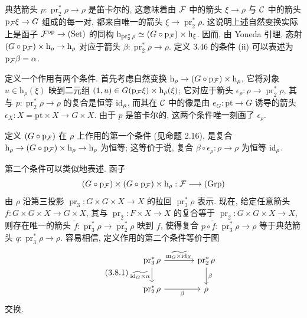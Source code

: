 典范箭头 $p:\operatorname{pr}_2^*\rho\to\rho$ 是笛卡尔的, 这意味着由 $\mathcal F$ 中的箭头 $\xi\to\rho$ 与 $\mathcal C$ 中的箭头 $\mathrm p_{\mathcal F}\xi\to G$ 组成的每一对, 都来自唯一的箭头 $\xi\to\operatorname{pr}_2^*\rho$. 这说明上述自然变换实际上是函子 $\mathcal F^{\mathrm{op}}\to(\mathrm{Set})$ 的同构 $\mathrm h_{\operatorname{pr}_2^*\rho}\simeq(G\circ\mathrm p_{\mathcal F})\times\mathrm h_\xi$. 因而, 由 Yoneda 引理, 态射 $(G\circ\mathrm p_{\mathcal F})\times\mathrm h_\rho\to\mathrm h_\rho$ 对应于箭头
$\beta:\operatorname{pr}_2^*\rho\to\rho$. 定义 3.46 的条件 (ii) 可以表述为 $\mathrm p_{\mathcal F}\beta=\alpha$.

定义一个作用有两个条件. 首先考虑自然变换 $\mathrm h_\rho\to(G\circ\mathrm p_{\mathcal F})\times\mathrm h_\rho$, 它将对象 $u\in\mathrm h_\rho(\xi)$ 映到二元组 $(1,u)\in G(\mathrm p_{\mathcal F}\xi)\times\mathrm h_\rho(\xi)$; 它对应于箭头 $\epsilon_\rho:\rho\to\operatorname{pr}_2^*\rho$, 其与 $p:\operatorname{pr}_2^*\rho\to\rho$ 的复合是恒等 $\mathrm{id}_\rho$, 而其在 $\mathcal C$ 中的像是由 $e_G:\mathrm{pt}\to G$ 诱导的箭头 $\epsilon_X:X=\mathrm{pt}\times X\to G\times X$. 由于 $p$ 是笛卡尔的, 这两个条件唯一刻画了 $\epsilon_\rho$.

定义 $(G\circ\mathrm p_{\mathcal F})$ 在 $\rho$ 上作用的第一个条件 (见命题 2.16), 是复合 $\mathrm h_\rho\to(G\circ\mathrm p_{\mathcal F})\times\mathrm h_\rho\to\mathrm h_\rho$ 为恒等; 这等价于说, 复合 $\beta\circ\epsilon_\rho:\rho\to\rho$ 为恒等 $\mathrm{id}_\rho$.

第二个条件可以类似地表述. 函子
\[
(G\circ\mathrm p_{\mathcal F})\times(G\circ\mathrm p_{\mathcal F})\times\mathrm h_\rho:\mathcal F\longrightarrow(\mathrm{Grp})
\]
由 $\rho$ 沿第三投影 $\operatorname{pr}_3:G\times G\times X\to X$ 的拉回 $\operatorname{pr}_3^*\rho$ 表示. 现在, 给定任意箭头 $f:G\times G\times X\to G\times X$, 其与 $\operatorname{pr}_2:F\times X\to X$ 的复合等于 $\operatorname{pr}_2:G\times G\times X\to X$, 则存在唯一的箭头 $\widetilde f:\operatorname{pr}_3^*\rho\to\operatorname{pr}_2^*\rho$ 映到 $f$, 使得复合 $p\circ\widetilde f:\operatorname{pr}_3^*\rho\to\rho$ 等于典范箭头 $q:\operatorname{pr}_3^*\rho\to\rho$. 容易相信, 定义作用的第二个条件等价于图
\begin{equation}
\tag{3.8.1}\label{ch03:eq381}
\begin{tikzcd}[column sep=large]
\operatorname{pr}_3^*\rho\arrow[r,"{\widetilde{\mathrm m_G\times\id_X}}"]\arrow[d,"{\widetilde{\id_G\times\alpha}}"']&\operatorname{pr}_2^*\rho\arrow[d,"{\beta}"]\\
\operatorname{pr}_2^*\rho\arrow[r,"{\beta}"']&\rho
\end{tikzcd}
\end{equation}
交换.

